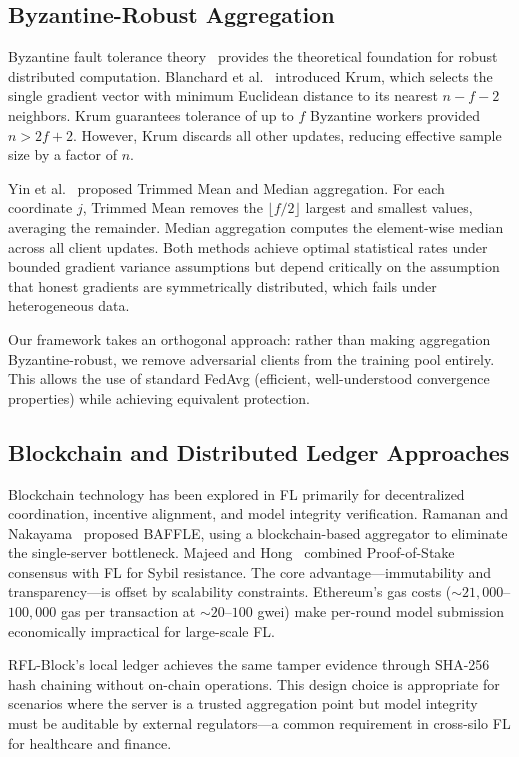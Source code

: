 \documentclass[conference]{IEEEtran}
\begin{document}
\subsection{Byzantine-Robust Aggregation}
Byzantine fault tolerance theory~\cite{lamport1982byzantine} provides the theoretical foundation for robust distributed computation. Blanchard et al.~\cite{blanchard2017krum} introduced Krum, which selects the single gradient vector with minimum Euclidean distance to its nearest $n-f-2$ neighbors. Krum guarantees tolerance of up to $f$ Byzantine workers provided $n > 2f + 2$. However, Krum discards all other updates, reducing effective sample size by a factor of $n$.

Yin et al.~\cite{yin2018trimmed} proposed Trimmed Mean and Median aggregation. For each coordinate $j$, Trimmed Mean removes the $\lfloor f/2 \rfloor$ largest and smallest values, averaging the remainder. Median aggregation computes the element-wise median across all client updates. Both methods achieve optimal statistical rates under bounded gradient variance assumptions but depend critically on the assumption that honest gradients are symmetrically distributed, which fails under heterogeneous data.

Our framework takes an orthogonal approach: rather than making aggregation Byzantine-robust, we remove adversarial clients from the training pool entirely. This allows the use of standard FedAvg (efficient, well-understood convergence properties) while achieving equivalent protection.

\subsection{Blockchain and Distributed Ledger Approaches}
Blockchain technology has been explored in FL primarily for decentralized coordination, incentive alignment, and model integrity verification. Ramanan and Nakayama~\cite{ramanan2022blockchainfl} proposed BAFFLE, using a blockchain-based aggregator to eliminate the single-server bottleneck. Majeed and Hong~\cite{majeed2021blockchainfl} combined Proof-of-Stake consensus with FL for Sybil resistance. The core advantage---immutability and transparency---is offset by scalability constraints. Ethereum's gas costs ($\sim 21{,}000$--$100{,}000$ gas per transaction at $\sim 20$--$100$ gwei) make per-round model submission economically impractical for large-scale FL.

RFL-Block's local ledger achieves the same tamper evidence through SHA-256 hash chaining without on-chain operations. This design choice is appropriate for scenarios where the server is a trusted aggregation point but model integrity must be auditable by external regulators---a common requirement in cross-silo FL for healthcare and finance.
\end{document}
